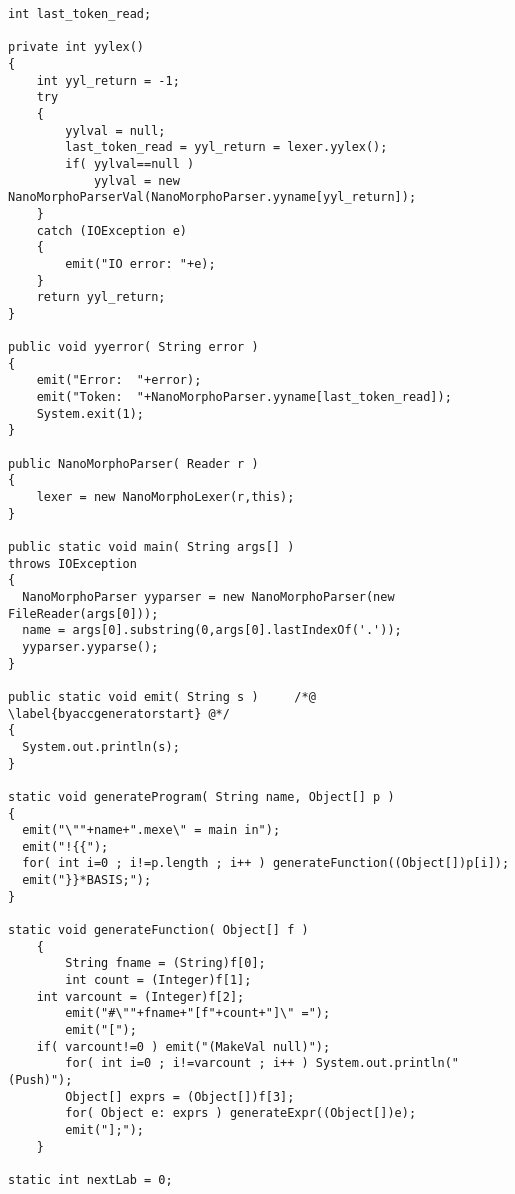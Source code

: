 \documentclass[]{article}
\begin{document}
\begin{lstlisting}
int last_token_read;

private int yylex()
{
	int yyl_return = -1;
	try
	{
		yylval = null;
		last_token_read = yyl_return = lexer.yylex();
		if( yylval==null )
			yylval = new NanoMorphoParserVal(NanoMorphoParser.yyname[yyl_return]);
	}
	catch (IOException e)
	{
		emit("IO error: "+e);
	}
	return yyl_return;
}

public void yyerror( String error )
{
	emit("Error:  "+error);
	emit("Token:  "+NanoMorphoParser.yyname[last_token_read]);
	System.exit(1);
}

public NanoMorphoParser( Reader r )
{
	lexer = new NanoMorphoLexer(r,this);
}

public static void main( String args[] )
throws IOException
{
  NanoMorphoParser yyparser = new NanoMorphoParser(new FileReader(args[0]));
  name = args[0].substring(0,args[0].lastIndexOf('.'));
  yyparser.yyparse();
}

public static void emit( String s )		/*@ \label{byaccgeneratorstart} @*/
{
  System.out.println(s);
}

static void generateProgram( String name, Object[] p )
{
  emit("\""+name+".mexe\" = main in");
  emit("!{{");
  for( int i=0 ; i!=p.length ; i++ ) generateFunction((Object[])p[i]);
  emit("}}*BASIS;");
}

static void generateFunction( Object[] f )
	{
		String fname = (String)f[0];
		int count = (Integer)f[1];
    int varcount = (Integer)f[2];
		emit("#\""+fname+"[f"+count+"]\" =");
		emit("[");
    if( varcount!=0 ) emit("(MakeVal null)");
		for( int i=0 ; i!=varcount ; i++ ) System.out.println("(Push)");    
		Object[] exprs = (Object[])f[3];
		for( Object e: exprs ) generateExpr((Object[])e);
		emit("];");
	}

static int nextLab = 0;


\end{lstlisting}
\end{document}
